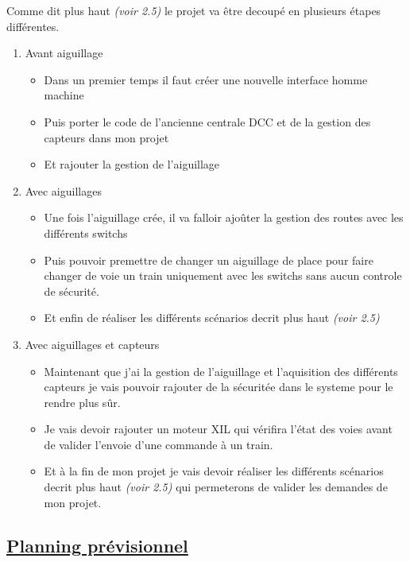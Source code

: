 Comme dit plus haut \emph{(voir 2.5)} le projet va \^etre decoup\'e en
plusieurs \'etapes diff\'erentes.

\begin{enumerate}[1]
  \item Avant aiguillage
  \begin{itemize}
    \item Dans un premier temps il faut cr\'eer une nouvelle interface
      homme machine
    \item Puis porter le code de l'ancienne centrale DCC et de la
      gestion des capteurs dans mon projet
    \item Et rajouter la gestion de l'aiguillage
  \end{itemize}

  \item Avec aiguillages
  \begin{itemize}
    \item Une fois l'aiguillage cr\'ee, il va falloir ajo\^uter la
      gestion des routes avec les différents switchs
    \item Puis pouvoir premettre de changer un aiguillage de place
      pour faire changer de voie un train uniquement avec les switchs
      sans aucun controle de s\'ecurit\'e.
    \item Et enfin de r\'ealiser les diff\'erents sc\'enarios decrit
      plus haut \emph{(voir 2.5)}
  \end{itemize}

  \item Avec aiguillages et capteurs
    \begin{itemize}
      \item Maintenant que j'ai la gestion de l'aiguillage et
        l'aquisition des différents capteurs je vais pouvoir rajouter
        de la s\'ecurit\'ee dans le systeme pour le rendre plus s\^ur.
      \item Je vais devoir rajouter un moteur XIL qui v\'erifira
        l'\'etat des voies avant de valider l'envoie d'une commande \`a
        un train.
      \item Et \`a la fin de mon projet je vais devoir r\'ealiser les
        diff\'erents sc\'enarios decrit plus haut \emph{(voir 2.5)}
        qui permeterons de valider les demandes de mon projet.      
    \end{itemize}
\end{enumerate}

\newpage

\subsection{\underline{ Planning pr\'evisionnel}}
\label{sec:planning}

